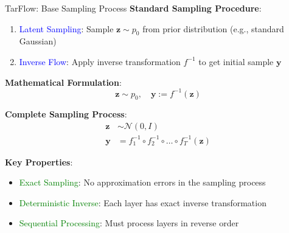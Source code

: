 \documentclass[aspectratio=169]{beamer}
\begin{document}
\begin{frame}{TarFlow: Base Sampling Process}
\textbf{Standard Sampling Procedure}:
\begin{enumerate}
    \item \textcolor{blue}{Latent Sampling}: Sample $\mathbf{z} \sim p_0$ from prior distribution (e.g., standard Gaussian)
    \item \textcolor{blue}{Inverse Flow}: Apply inverse transformation $f^{-1}$ to get initial sample $\mathbf{y}$
\end{enumerate}

\textbf{Mathematical Formulation}:
\begin{equation}
    \mathbf{z} \sim p_0, \quad \mathbf{y} := f^{-1}(\mathbf{z})
\end{equation}

\textbf{Complete Sampling Process}:
\begin{align}
    \mathbf{z} &\sim \mathcal{N}(0, I) \\
    \mathbf{y} &= f_1^{-1} \circ f_2^{-1} \circ \ldots \circ f_T^{-1}(\mathbf{z})
\end{align}

\textbf{Key Properties}:
\begin{itemize}
    \item \textcolor{green}{Exact Sampling}: No approximation errors in the sampling process
    \item \textcolor{green}{Deterministic Inverse}: Each layer has exact inverse transformation
    \item \textcolor{green}{Sequential Processing}: Must process layers in reverse order
\end{itemize}
\end{frame}
\end{document}
